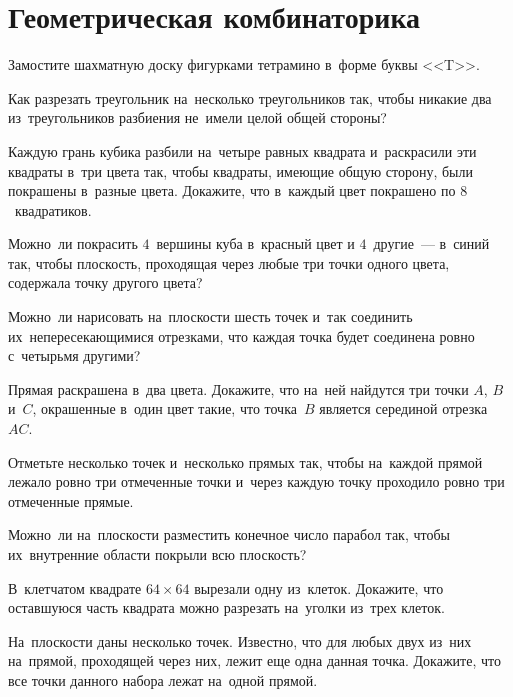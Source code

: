 
\section*{Геометрическая комбинаторика}


\begin{problems}

\item
Замостите шахматную доску фигурками тетрамино в~форме буквы <<\textsf{T}>>.

\item
Как разрезать треугольник на~несколько треугольников так, чтобы никакие два
из~треугольников разбиения не~имели целой общей стороны?

\item
Каждую грань кубика разбили на~четыре равных квадрата и~раскрасили эти квадраты
в~три цвета так, чтобы квадраты, имеющие общую сторону, были покрашены в~разные
цвета.
Докажите, что в~каждый цвет покрашено по $8$~квадратиков.

\item
Можно~ли покрасить $4$~вершины куба в~красный цвет и $4$~другие~--- в~синий
так, чтобы плоскость, проходящая через любые три точки одного цвета, содержала
точку другого цвета?

\item
Можно~ли нарисовать на~плоскости шесть точек и~так соединить
их~непересекающимися отрезками, что каждая точка будет соединена ровно
с~четырьмя другими?

\item
Прямая раскрашена в~два цвета.
Докажите, что на~ней найдутся три точки $A$, $B$ и~$C$, окрашенные в~один цвет
такие, что точка~$B$ является серединой отрезка~$AC$.

\item
Отметьте несколько точек и~несколько прямых так, чтобы на~каждой прямой лежало
ровно три отмеченные точки и~через каждую точку проходило ровно три отмеченные
прямые.

\item
Можно~ли на~плоскости разместить конечное число парабол так, чтобы
их~внутренние области покрыли всю плоскость?

\item
В~клетчатом квадрате $64 \times 64$ вырезали одну из~клеток.
Докажите, что оставшуюся часть квадрата можно разрезать на~уголки из~трех
клеток.

\item
На~плоскости даны несколько точек.
Известно, что для любых двух из~них на~прямой, проходящей через них, лежит еще 
одна данная точка.
Докажите, что все точки данного набора лежат на~одной прямой.

\end{problems}

